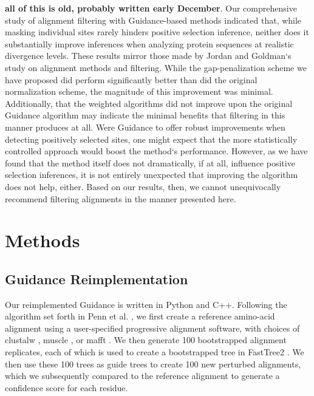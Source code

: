 \documentclass[10pt]{article}
\begin{document}
\textbf{all of this is old, probably written early December}.
Our comprehensive study of alignment filtering with Guidance-based methods indicated that, while masking individual sites rarely hinders positive selection inference, neither does it substantially improve inferences when analyzing protein sequences at realistic divergence levels. These results mirror those made by Jordan and Goldman`s \citep{Jordan2011} study on alignment methods and filtering. While the gap-penalization scheme we have proposed did perform significantly better than did the original normalization scheme, the magnitude of this improvement was minimal. Additionally, that the weighted algorithms did not improve upon the original Guidance algorithm may indicate the minimal benefits that filtering in this manner produces at all. Were Guidance to offer robust improvements when detecting positively selected sites, one might expect that the more statistically controlled approach would boost the method`s performance. However, as we have found that the method itself does not dramatically, if at all, influence positive selection inferences, it is not entirely unexpected that improving the algorithm does not help, either. Based on our results, then, we cannot unequivocally recommend filtering alignments in the manner presented here. 

\section*{Methods}

\subsection*{Guidance Reimplementation}
Our reimplemented Guidance is written in Python and C++. Following the algorithm set forth in Penn et al. \citep{Penn2010}, we first create a reference amino-acid alignment using a user-specified progressive alignment software, with choices of clustalw \citep{Thompson1994}, muscle \citep{Edgar2004}, or mafft \citep{Katoh2002, Katoh2005}. We then generate 100 bootstrapped alignment replicates, each of which is used to create a bootstrapped tree in FastTree2 \citep{Price2010}. We then use these 100 trees as guide trees to create 100 new perturbed alignments, which we subsequently compared to the reference alignment to generate a confidence score for each residue.
\end{document}
